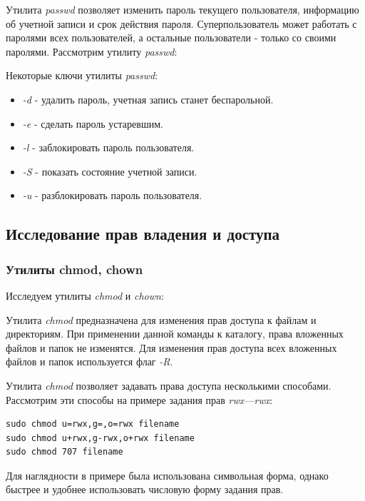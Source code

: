 \documentclass[14pt,a4paper,report]{report}
\begin{document}
Утилита \emph{passwd} позволяет изменить пароль текущего пользователя, информацию об учетной записи и срок действия пароля. Суперпользователь может работать с паролями всех пользователей, а остальные пользователи - только со своими паролями. Рассмотрим утилиту \emph{passwd}:



Некоторые ключи утилиты \emph{passwd}:

\begin{itemize}
	\item \emph{-d} - удалить пароль, учетная запись станет беспарольной.
	\item \emph{-e} - сделать пароль устаревшим.
	\item \emph{-l} - заблокировать пароль пользователя.
	\item \emph{-S} - показать состояние учетной записи.
	\item \emph{-u} - разблокировать пароль пользователя.
\end{itemize}

\subsection{Исследование прав владения и доступа}

\subsubsection{Утилиты chmod, chown}

Исследуем утилиты \emph{chmod} и \emph{chown}:



Утилита \emph{chmod} предназначена для изменения прав доступа к файлам и директориям. При применении данной команды к каталогу, права вложенных файлов и папок не изменятся. Для изменения прав доступа всех вложенных файлов и папок используется флаг \emph{-R}. 

Утилита \emph{chmod} позволяет задавать права доступа несколькими способами. Рассмотрим эти способы на примере задания прав \emph{rwx---rwx}:

\begin{verbatim}
sudo chmod u=rwx,g=,o=rwx filename
sudo chmod u+rwx,g-rwx,o+rwx filename
sudo chmod 707 filename
\end{verbatim}

Для наглядности в примере была использована символьная форма, однако быстрее и удобнее использовать числовую форму задания прав.
\end{document}
